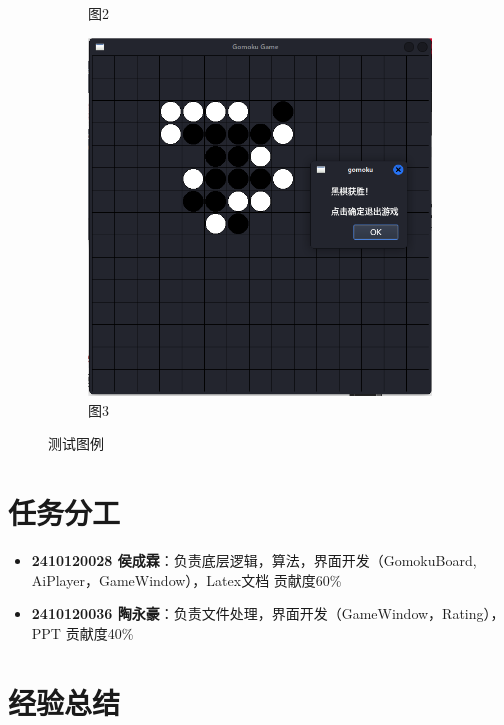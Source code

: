 \documentclass[UTF8]{ctexart}
\begin{document}
\begin{figure}[htbp]
\begin{subfigure}[b]{0.3\textwidth}
        \caption{图2}
        \label{fig:image2}
    \end{subfigure}%
    \hfill
    \begin{subfigure}[b]{0.3\textwidth}
        \centering
        \includegraphics[width=\textwidth]{screenshoot3.png}
        \caption{图3}
        \label{fig:image3}
    \end{subfigure}
    \caption{测试图例}
    \label{fig:allimages}
\end{figure}

\section{任务分工}
\begin{itemize}
    \item \textbf{2410120028 侯成霖}：负责底层逻辑，算法，界面开发（GomokuBoard, AiPlayer，GameWindow），Latex文档 贡献度60\%
    \item \textbf{2410120036 陶永豪}：负责文件处理，界面开发（GameWindow，Rating），PPT 贡献度40\%
\end{itemize}

\section{经验总结}
\end{document}
